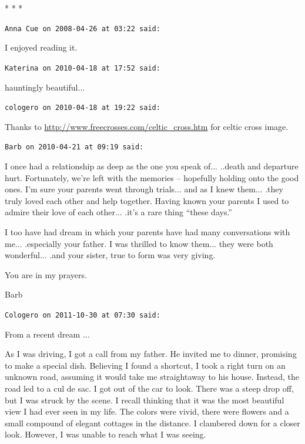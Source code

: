 
\begin{center}* * *\end{center}

\begin{footnotesize}
\begin{sffamily}
\texttt{Anna Cue on 2008-04-26 at 03:22 said:}

I enjoyed reading it.

\hfill

\texttt{Katerina on 2010-04-18 at 17:52 said:}

hauntingly beautiful... 

\hfill

\texttt{cologero on 2010-04-18 at 19:22 said:}

Thanks to \url{http://www.freecrosses.com/celtic\_cross.htm} for celtic cross image.

\hfill

\texttt{Barb on 2010-04-21 at 09:19 said:}

I once had a relationship as deep as the one you speak of... ..death and departure hurt. Fortunately, we're left with the memories -- hopefully holding onto the good ones. I'm sure your parents went through trials... and as I knew them... .they truly loved each other and help together. Having known your parents I used to admire their love of each other... .it's a rare thing ``these days.''

I too have had dream in which your parents have had many conversations with me... .especially your father. I was thrilled to know them... they were both wonderful... .and your sister, true to form was very giving.

You are in my prayers.

Barb

\hfill

\texttt{Cologero on 2011-10-30 at 07:30 said:}

From a recent dream ... 

As I was driving, I got a call from my father. He invited me to dinner, promising to make a special dish. Believing I found a shortcut, I took a right turn on an unknown road, assuming it would take me straightaway to his house. Instead, the road led to a cul de sac. I got out of the car to look. There was a steep drop off, but I was struck by the scene. I recall thinking that it was the most beautiful view I had ever seen in my life. The colors were vivid, there were flowers and a small compound of elegant cottages in the distance. I clambered down for a closer look. However, I was unable to reach what I was seeing.


\end{sffamily}
\end{footnotesize}

